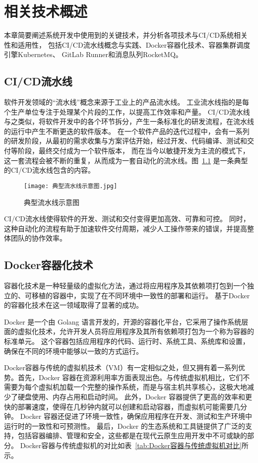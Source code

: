 
\chapter{相关技术概述}
本章简要阐述系统开发中使用到的关键技术，并分析各项技术与CI/CD系统相关性和适用性，
包括CI/CD流水线概念与实践、Docker容器化技术、容器集群调度引擎Kubernetes、 GitLab Runner和消息队列RocketMQ。

\section{CI/CD流水线}
软件开发领域的“流水线”概念来源于工业上的产品流水线。
工业流水线指的是每个生产单位专注于处理某个片段的工作，以提高工作效率和产量。
CI/CD流水线与之类似，将软件开发中的各个环节拆分，产生一条标准化的研发流程，在流水线的运行中产生不断更迭的软件版本。
在一个软件产品的迭代过程中，会有一系列的研发阶段，从最初的需求收集与方案评估开始，经过开发、代码编译、测试和交付等阶段，最终交付成为一个软件版本，
而在当今以敏捷开发为主流的模式下，这一套流程会被不断的重复，从而成为一套自动化的流水线。图~\ref{fig:典型流水线示意图} 是一条典型的CI/CD流水线包含的内容。

\begin{figure}[h]
    \centering
    \texttt{[image: 典型流水线示意图.jpg]}
    \caption{典型流水线示意图}
    \label{fig:典型流水线示意图}
  \end{figure}

CI/CD流水线使得软件的开发、测试和交付变得更加高效、可靠和可控\cite{mohammad2016continuous}。
同时，这种自动化的流程有助于加速软件交付周期，减少人工操作带来的错误，并提高整体团队的协作效率。

\section{Docker容器化技术}
容器化技术是一种轻量级的虚拟化方法，通过将应用程序及其依赖项打包到一个独立的、可移植的容器中，实现了在不同环境中一致性的部署和运行。
基于Docker的容器化技术在这一领域取得了显著的成功。

Docker 是一个由 Golang 语言开发的，开源的容器化平台，它采用了操作系统层面的虚拟化技术，允许开发人员将应用程序及其所有依赖项打包为一个称为容器的标准单元\cite{第二章Docker}。
这个容器包括应用程序的代码、运行时、系统工具、系统库和设置，确保在不同的环境中能够以一致的方式运行。

Docker容器与传统的虚拟机技术（VM）有一定相似之处，但又拥有着一系列优势。首先，Docker 容器在资源利用率方面表现出色\cite{张忠琳2014基于}。与传统虚拟机相比，它们不需要为每个虚拟机加载一个完整的操作系统，而是与宿主机共享核心，这极大地减少了硬盘使用、内存占用和启动时间。
此外，Docker 容器提供了更高的效率和更快的部署速度，使得在几秒钟内就可以创建和启动容器，而虚拟机可能需要几分钟\cite{JSJY201704001}。
Docker 容器还促进了环境一致性，确保应用程序在开发、测试和生产环境中运行时的一致性和可预测性。
最后，Docker 的生态系统和工具链提供了广泛的支持\cite{DGJB201806026}，包括容器编排、管理和安全，这些都是在现代云原生应用开发中不可或缺的部分。
Docker容器与传统虚拟机的对比如表~\ref{tab:Docker容器与传统虚拟机对比}所示。

